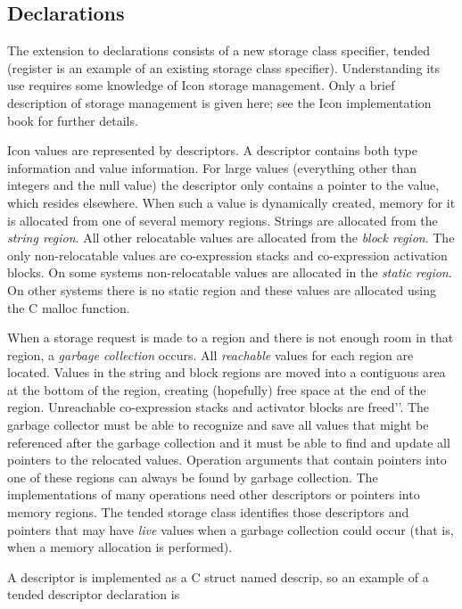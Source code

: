 \subsection{Declarations}

The extension to declarations consists of a new storage class
specifier, tended (register is an example of an existing storage class
specifier). Understanding its use requires some knowledge of Icon
storage management. Only a brief description of storage management is
given here; see the Icon implementation book for further details.

Icon values are represented by descriptors. A descriptor contains both
type information and value information. For large values (everything
other than integers and the null value) the descriptor only contains a
pointer to the value, which resides elsewhere. When such a value is
dynamically created, memory for it is allocated from one of several
memory regions. Strings are allocated from the \textit{string
region}. All other relocatable values are allocated from the
\textit{block region}. The only non-relocatable values are
co-expression stacks and co-expression activation blocks. On some
systems non-relocatable values are allocated in the \textit{static
region}. On other systems there is no static region and these values
are allocated using the C malloc function.

When a storage request is made to a region and there is not enough
room in that region, a \textit{garbage collection} occurs. All
\textit{reachable} values for each region are located. Values in the
string and block regions are moved into a contiguous area at the
bottom of the region, creating (hopefully) free space at the end of
the region.  Unreachable co-expression stacks and activator blocks are
{\textasciigrave}{\textasciigrave}freed'{}'. The garbage collector
must be able to recognize and save all values that might be referenced
after the garbage collection and it must be able to find and update
all pointers to the relocated values. Operation arguments that contain
pointers into one of these regions can always be found by garbage
collection. The implementations of many operations need other
descriptors or pointers into memory regions. The tended storage class
identifies those descriptors and pointers that may have \textit{live}
values when a garbage collection could occur (that is, when a memory
allocation is performed).

A descriptor is implemented as a C struct named descrip, so an example
of a tended descriptor declaration is

